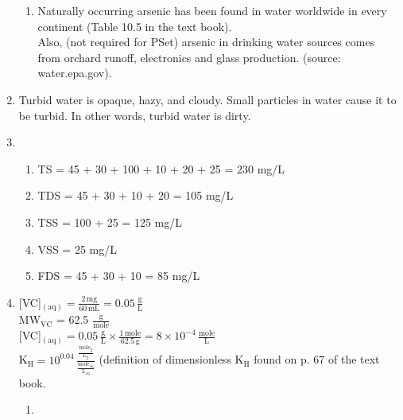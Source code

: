 \documentclass[12pt,letterpaper]{article}
\begin{document}
\begin{enumerate}
\begin{enumerate}
\item Naturally occurring arsenic has been found in water worldwide in every continent (Table 10.5 in the text book).\\

Also, (not required for PSet) arsenic in drinking water sources comes from orchard runoff, electronics and glass production. (source: water.epa.gov).\\

\end{enumerate}

\item Turbid water is opaque, hazy, and cloudy.  Small particles in water cause it to be turbid.  In other words, turbid water is dirty.\\

\item 
\begin{enumerate}
\item
TS = 45 + 30 + 100 + 10 + 20 + 25 = 230 mg/L

\item TDS = 45 + 30 + 10 + 20 = 105 mg/L

\item TSS = 100 + 25 = 125 mg/L

\item VSS = 25 mg/L

\item FDS = 45 + 30 + 10 = 85 mg/L\\

\end{enumerate}

\item 

[VC]$\mathrm{_{(aq)} = \frac{2\, mg}{60\, mL} = 0.05 \,\frac{g}{L}}$\\

MW$\mathrm{_{VC}}$ = 62.5 $\mathrm{\frac{g}{mole}}$\\

[VC]$\mathrm{_{(aq)} = 0.05 \,\frac{g}{L}\times \frac{1\, mole}{62.5\, g} = 8 \times10^{-4}\, \frac{mole}{L}}$\\

K$\mathrm{_{H} = 10^{0.04}\, \frac{\frac{mole_g}{L_g}}{\frac{mole_{aq}}{L_{aq}}}}$ (definition of dimensionless K$\mathrm{_H}$ found on p. 67 of the text book.\\

\begin{enumerate}
\item


\end{enumerate}
\end{enumerate}
\end{document}
